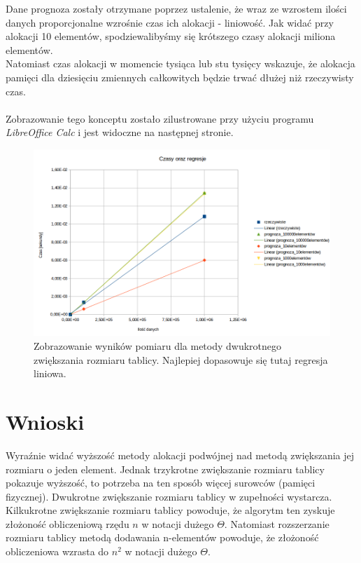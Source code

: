 \documentclass[11pt,a4paper]{article}
\begin{document}
\bigskip
\bigskip

Dane prognoza zostały otrzymane poprzez ustalenie, że wraz ze wzrostem ilości danych proporcjonalne wzrośnie czas ich alokacji - liniowość. Jak widać przy alokacji 10 elementów, spodziewalibyśmy się krótszego czasy alokacji miliona elementów.\\
Natomiast czas alokacji w momencie tysiąca lub stu tysięcy wskazuje, że alokacja pamięci dla dziesięciu zmiennych całkowitych będzie trwać dłużej niż rzeczywisty czas.\\\\
Zobrazowanie tego konceptu zostało zilustrowane przy użyciu programu \textit{LibreOffice Calc} i jest widoczne na następnej stronie.

\newpage

\begin{figure}

	\includegraphics[scale=0.5,left]{../wykresy/CzasyOrazRegresje.png}

\caption{Zobrazowanie wyników pomiaru dla metody dwukrotnego zwiększania rozmiaru tablicy. Najlepiej dopasowuje się tutaj regresja liniowa.}
\end{figure}


\section{Wnioski}

\hspace{4ex} Wyraźnie widać wyższość metody alokacji podwójnej nad metodą zwiększania jej rozmiaru o jeden element. Jednak trzykrotne zwiększanie rozmiaru tablicy pokazuje wyższość, to potrzeba na ten sposób więcej surowców (pamięci fizycznej). Dwukrotne zwiększanie rozmiaru tablicy w zupełności wystarcza.\\
Kilkukrotne zwiększanie rozmiaru tablicy powoduje, że algorytm ten zyskuje złożoność obliczeniową rzędu $n$ w notacji dużego $\Theta$. Natomiast rozszerzanie rozmiaru tablicy metodą dodawania n-elementów powoduje, że złożoność obliczeniowa wzrasta do $n^2$ w notacji dużego $\Theta$.
\end{document}
